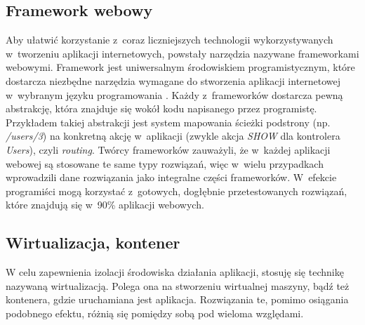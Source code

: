 \documentclass[mgr,oneside]{mgr}
\begin{document}
\subsection{Framework webowy} %
Aby ułatwić korzystanie z~coraz liczniejszych technologii wykorzystywanych w~tworzeniu aplikacji internetowych, powstały narzędzia nazywane frameworkami webowymi. Framework jest uniwersalnym środowiskiem programistycznym, które dostarcza niezbędne narzędzia wymagane do stworzenia aplikacji internetowej w~wybranym języku programowania \cite{framework}. Każdy z~frameworków dostarcza pewną abstrakcję, która znajduje się wokół kodu napisanego przez programistę. Przykładem takiej abstrakcji jest system mapowania ścieżki podstrony (np. \textit{/users/3}) na konkretną akcję w~aplikacji (zwykle akcja \emph{SHOW} dla kontrolera \emph{Users}), czyli \emph{routing}. Twórcy frameworków zauważyli, że w~każdej aplikacji webowej są stosowane te same typy rozwiązań, więc w~wielu przypadkach wprowadzili dane rozwiązania jako integralne części frameworków. W~efekcie programiści mogą korzystać z~gotowych, dogłębnie przetestowanych rozwiązań, które znajdują się w~90\% aplikacji webowych.

\subsection{Wirtualizacja, kontener} %
W celu zapewnienia izolacji środowiska działania aplikacji, stosuję się technikę nazywaną wirtualizacją. Polega ona na stworzeniu wirtualnej maszyny, bądź też kontenera, gdzie uruchamiana jest aplikacja. Rozwiązania te, pomimo osiągania podobnego efektu, różnią się pomiędzy sobą pod wieloma względami.
\end{document}
